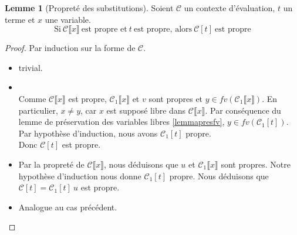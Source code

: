 \documentclass[11pt,a4paper]{article}
\theoremstyle{definition}
\newtheorem{lemma}[theorem]{Lemme}
\begin{document}
\begin{lemma}[Propreté des substitutions]
  \label{prls}
 Soient $\mathcal{C}$ un contexte d'évaluation, $t$ un terme et $x$ une variable.
 \[ \text{Si}~\mathcal{C}\llbracket x \rrbracket~\text{est propre et}~t~\text{est propre, alors}~ \mathcal{C}[t]~\text{est propre}\]
\end{lemma}
\begin{proof}
  Par induction sur la forme de $\mathcal{C}$.
  \begin{itemize}
    \item {} trivial.
    \item {}\\
      Comme $\mathcal{C}\llbracket x\rrbracket$ est propre, $\mathcal{C}_1\llbracket x \rrbracket$ et $v$ sont propres et $y\in fv(\mathcal{C}_1\llbracket x\rrbracket)$.
      En particulier, $x \neq y$, car $x$ est supposé libre dans $\mathcal{C}\llbracket x \rrbracket$.
      Par conséquence du lemme de préservation des variables libres \ref{lemmapresfv}, $y \in fv(\mathcal{C}_1[t])$.\\
      Par hypothèse d'induction, nous avons $\mathcal{C}_1[t]$ propre.\\
      Donc $\mathcal{C}[t]$ est propre.
    \item {}
      Par la propreté de $\mathcal{C}\llbracket x \rrbracket$, nous déduisons que $u$ et $\mathcal{C}_1\llbracket x \rrbracket$ sont propres.
      Notre hypothèse d'induction nous donne $\mathcal{C}_1[t]$ propre. 
      Nous déduisons que $\mathcal{C}[t] = \mathcal{C}_1[t]~u$ est propre.
    \item {} Analogue au cas précédent.
  \end{itemize}
\end{proof}
\end{document}
